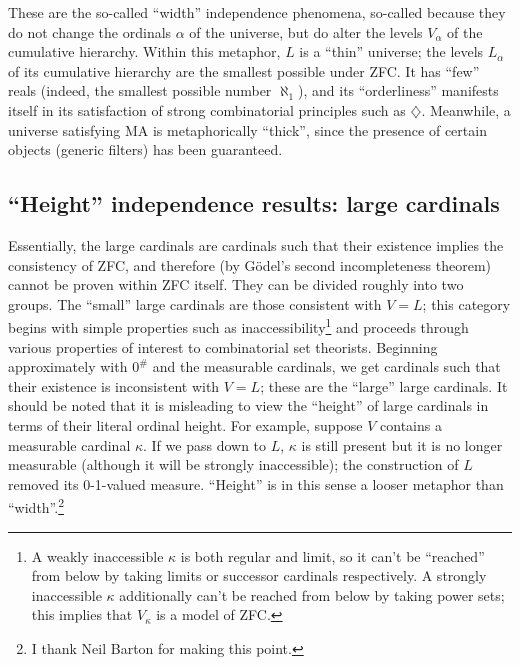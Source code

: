 \documentclass[letterpaper,12pt]{article}
\begin{document}
These are the so-called ``width'' independence phenomena, so-called because they do not change the ordinals $\alpha$ of the universe, but do alter the levels $V_\alpha$ of the cumulative hierarchy. Within this metaphor, $L$ is a ``thin'' universe; the levels $L_\alpha$ of its cumulative hierarchy are the smallest possible under ZFC. It has ``few'' reals (indeed, the smallest possible number $\aleph_1$), and its ``orderliness'' manifests itself in its satisfaction of strong combinatorial principles such as $\diamondsuit$. Meanwhile, a universe satisfying MA is metaphorically ``thick'', since the presence of certain objects (generic filters) has been guaranteed.


\subsection{``Height'' independence results: large cardinals}
\label{height}
Essentially, the large cardinals are cardinals such that their existence implies the consistency of ZFC, and therefore (by G\"odel's second incompleteness theorem) cannot be proven within ZFC itself. They can be divided roughly into two groups. The ``small'' large cardinals are those consistent with $V = L$; this category begins with simple properties such as inaccessibility\footnote{A weakly inaccessible $\kappa$ is both regular and limit, so it can't be ``reached'' from below by taking limits or successor cardinals respectively. A strongly inaccessible $\kappa$ additionally can't be reached from below by taking power sets; this implies that $V_\kappa$ is a model of ZFC.} and proceeds through various properties of interest to combinatorial set theorists. Beginning approximately with $0^\#$ and the measurable cardinals, we get cardinals such that their existence is inconsistent with $V = L$; these are the ``large'' large cardinals. It should be noted that it is misleading to view the ``height'' of large cardinals in terms of their literal ordinal height. For example, suppose $V$ contains a measurable cardinal $\kappa$. If we pass down to $L$, $\kappa$ is still present but it is no longer  measurable (although it will be strongly inaccessible); the construction of $L$ removed its 0-1-valued measure. ``Height'' is in this sense a looser metaphor than ``width''.\footnote{I thank Neil Barton for making this point.}
\end{document}
